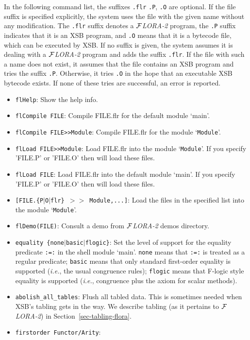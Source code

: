 \documentclass[11pt]{article}
\newcommand{\FLORA}{{\mbox{${\cal F}${\small\it LORA}\rm\emph{-2}}}\xspace}
\begin{document}
In the following command list, the suffixes {\tt .flr} {\tt .P}, {\tt .O}
are optional. If the file suffix is specified explicitly, the system uses
the file with the given name without any modification. The {\tt .flr}
suffix denotes a \FLORA program, the {\tt .P} suffix indicates that it is an
XSB program, and {\tt .O} means that it is a bytecode file, which can be
executed by XSB.  If no suffix is given, the system assumes it is dealing
with a \FLORA program and adds the suffix {\tt .flr}. If the file with such a
name does not exist, it assumes that the file contains an XSB program and
tries the suffix {\tt .P}. Otherwise, it tries {\tt .O} in the hope that an
executable XSB bytecode exists. If none of these tries are successful, an
error is reported.
%
\begin{itemize}
\item {\tt flHelp}:
    Show the help info.
\item {\tt flCompile FILE}:
    Compile FILE.flr for the default module `main'.
\item {\tt flCompile FILE>>Module}:
    Compile FILE.flr for the module `{\tt Module}'.
\item {\tt flLoad FILE>>Module}:
    Load FILE.flr into the module `{\tt Module}'. If you specify 'FILE.P'
    or 'FILE.O' then will load these files.
\item {\tt flLoad FILE}:
    Load FILE.flr into the default module `main'. If you specify 'FILE.P'
    or 'FILE.O' then will load these files.
\item {\tt [FILE.\{P$|$O$|$flr\} $>>$ Module,...]}:
    Load the files in the specified list into the module `{\tt Module}'.
\item {\tt flDemo(FILE)}:
    Consult a demo from \FLORA demos directory.
\item {\tt equality \{none$|$basic$|$flogic\}}:
    Set the level of support for the equality predicate {\tt :=:} in the
    shell module `main'.
    {\tt none}  means that {\tt :=:} is treated as a regular
    predicate; {\tt basic} means that only standard first-order equality is
    supported ({\it i.e.}, the usual congruence rules); {\tt flogic} means
    that F-logic style equality is supported ({\it i.e.}, congruence plus
    the axiom for scalar methods).
\item {\tt abolish\_all\_tables}:
    Flush all tabled data. This is sometimes needed when XSB's tabling 
    gets in the way. We describe tabling (as it pertains to \FLORA) in
    Section~\ref{sec-tabling-flora}.
\item {\tt firstorder Functor/Arity}:

\end{itemize}
\end{document}
